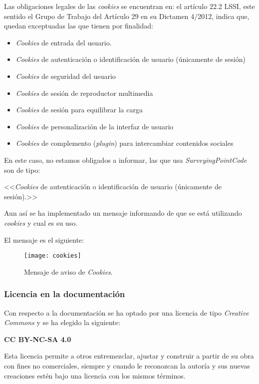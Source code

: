 Las obligaciones legales de las \emph{cookies} se encuentran en: el artículo 22.2 LSSI, este sentido el Grupo de Trabajo del Artículo 29 en su Dictamen 4/2012, indica que, quedan exceptuadas las que tienen por finalidad:

\begin{itemize}

\item\emph{Cookies} de entrada del usuario.
\item\emph{Cookies} de autenticación o identificación de usuario (únicamente de sesión)
\item\emph{Cookies} de seguridad del usuario
\item\emph{Cookies} de sesión de reproductor multimedia
\item\emph{Cookies} de sesión para equilibrar la carga
\item\emph{Cookies} de personalización de la interfaz de usuario
\item\emph{Cookies} de complemento (\emph{plugin}) para intercambiar contenidos sociales

\end{itemize}

En este caso, no estamos obligados a informar\cite{cookies}, las que usa \emph{SurveyingPointCode} son de tipo:

<<\emph{Cookies} de autenticación o identificación de usuario (únicamente de sesión).>>

Aun así se ha implementado un mensaje informando de que se está utilizando \emph{cookies} y cual es su uso.

El mensaje es el siguiente:
 
\begin{figure}[H]
	\centering
	\texttt{[image: cookies]}
	\caption{Mensaje de aviso de \emph{Cookies}.}
	\label{fig:Scrum}
\end{figure}


\subsubsection{Licencia en la documentación}

Con respecto a la documentación se ha optado por una licencia de tipo \emph{Creative Commons} y se ha elegido la siguiente:

\textbf{CC BY-NC-SA 4.0}\cite{creativec}

Esta licencia permite a otros entremezclar, ajustar y construir a partir de su obra con fines no comerciales, siempre y cuando le reconozcan la autoría y sus nuevas creaciones estén bajo una licencia con los mismos términos.

